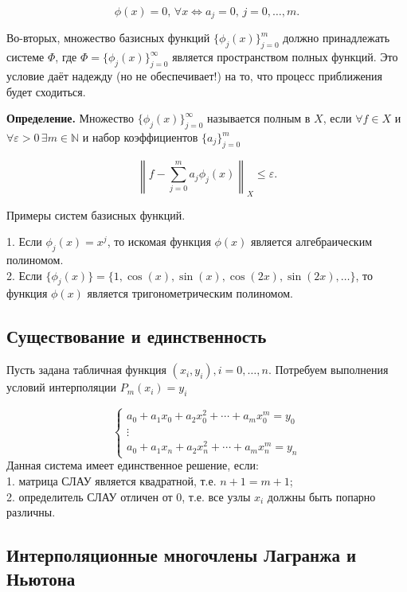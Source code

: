 $$\phi(x) = 0, \, \forall x \Leftrightarrow a_j = 0, \, j = 0, \dots, m.$$

Во-вторых, множество базисных функций \(\{ \phi_j(x) \}_{j=0}^m\) должно принадлежать системе \(\Phi\), где \(\Phi = \{ \phi_j(x) \}_{j=0}^\infty\) является пространством полных функций. Это условие даёт надежду (но не обеспечивает!) на то, что процесс приближения будет сходиться.

\textbf{Определение.} 
Множество \(\{ \phi_j(x) \}_{j=0}^\infty\) называется полным в \(X\), если \(\forall f \in X\) и \(\forall \varepsilon > 0 \, \exists m \in \mathbb{N}\) и набор коэффициентов \(\{ a_j \}_{j=0}^m\)

$$\left\| f - \sum_{j=0}^m a_j \phi_j(x) \right\|_X \leq \varepsilon.$$

Примеры систем базисных функций.

1. Если \(\phi_j(x) = x^j\), то искомая функция \(\phi(x)\) является алгебраическим полиномом.\\

2. Если \(\{ \phi_j(x) \} = \{ 1, \cos(x), \sin(x), \cos(2x), \sin(2x), \dots \}\), то функция \(\phi(x)\) является тригонометрическим полиномом.

\subsection{Существование и единственность}

Пусть задана табличная функция \( (x_i, y_i), i = 0, \ldots, n \). Потребуем выполнения условий интерполяции \( P_m(x_i) = y_i \)

\[\begin{cases} 
	a_0 + a_1 x_0 + a_2 x_0^2 + \cdots + a_m x_0^m = y_0 \\ 
	\vdots \\ 
	a_0 + a_1 x_n + a_2 x_n^2 + \cdots + a_m x_n^m = y_n 
\end{cases}
\]
Данная система имеет единственное решение, если:\\

1. матрица СЛАУ является квадратной, т.е. \( n + 1 = m + 1 \);\\

2. определитель СЛАУ отличен от 0, т.е. все узлы \( x_i \) должны быть попарно различны.

\subsection{Интерполяционные многочлены Лагранжа и Ньютона}

